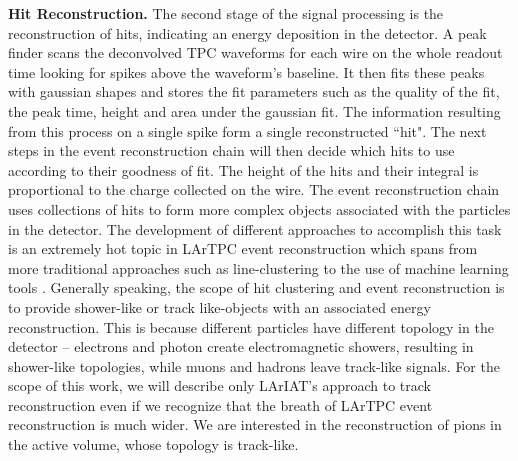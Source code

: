 \documentclass[aps,prl,twocolumn,showpacs,superscriptaddress,groupedaddress]{revtex4}  %
\begin{document}
\textbf{Hit Reconstruction.} The second stage of the signal processing is the reconstruction of hits, indicating an energy deposition in the detector.  A peak finder scans the deconvolved TPC waveforms for each wire on the whole readout time looking for spikes  above  the waveform's baseline. It then fits these peaks with gaussian shapes and stores the fit parameters such as the quality of the fit, the peak time, height and area under the gaussian fit. The information resulting from this process on a single spike form a single reconstructed ``hit". %
 The next steps in the event reconstruction chain will then decide which hits to use according to their goodness of fit. %
The height of the hits and their integral is proportional to the charge collected on the wire.
The event reconstruction chain uses collections of hits to form more complex objects associated with the particles in the detector. The development of different approaches to accomplish this task is an extremely hot topic in LArTPC event reconstruction which spans from more traditional approaches such as line-clustering  \cite{Barker2011} to the use of machine learning tools \cite{1748-0221-12-03-P03011}. Generally speaking, the scope of hit clustering and event reconstruction is to provide shower-like or track like-objects with an associated energy reconstruction. This is because different particles have different topology in the detector -- electrons and photon create electromagnetic showers,  resulting in shower-like topologies, while muons and hadrons  leave track-like signals.  For the scope of this work, we will describe only LArIAT's approach to track reconstruction even if we recognize that the breath of LArTPC event reconstruction is much wider. We are interested in the reconstruction of pions in the active volume, whose topology is track-like.\\
\end{document}

